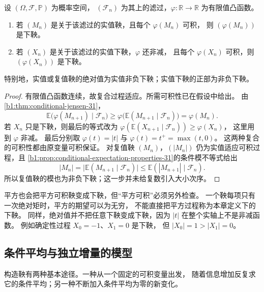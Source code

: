 \begin{proposition}[凸函数作用下的鞅]
\label{b1:prop:martingale-convex-31}
设 \((\Omega,\mathcal F,\mathbb P)\) 为概率空间，
\((\mathcal F_n)\) 为其上的滤过，\(\varphi:\mathbb R\to\mathbb R\) 为有限值凸函数。
\begin{enumerate}
 \item\label{b1:item:martingale-convex-31}
 若 \((M_n)\) 是关于该滤过的实值鞅，且每个 \(\varphi(M_n)\) 可积，
 则 \((\varphi(M_n))\) 是下鞅。
 \item\label{b1:item:submartingale-convex-31}
 若 \((X_n)\) 是关于该滤过的实值下鞅，\(\varphi\) 还非减，
 且每个 \(\varphi(X_n)\) 可积，则 \((\varphi(X_n))\) 是下鞅。
\end{enumerate}
特别地，实值或复值鞅的绝对值为实值非负下鞅；实值下鞅的正部为非负下鞅。
\end{proposition}
\begin{proof}
有限值凸函数连续，故复合过程适应。所需可积性已在假设中给出。
由\cref{b1:thm:conditional-jensen-31}，
\[
 \mathbb E\bigl(\varphi(M_{n+1})\mid\mathcal F_n\bigr)
 \geq\varphi\bigl(\mathbb E(M_{n+1}\mid\mathcal F_n)\bigr)
 =\varphi(M_n).
\]
若 \(X_n\) 只是下鞅，则最后的等式改为
\(\varphi(\mathbb E(X_{n+1}\mid\mathcal F_n))\geq\varphi(X_n)\)，
这里用到 \(\varphi\) 非减。
最后分别取 \(\varphi(t)=|t|\) 与 \(\varphi(t)=t^+=\max(t,0)\)。
这两种复合的可积性都由原变量可积保证。
对复值鞅 \((M_n)\)，\((|M_n|)\) 仍为实值适应可积过程，且%
\cref{b1:prop:conditional-expectation-properties-31}的条件模不等式给出
\[
 |M_n|=\bigl|\mathbb E(M_{n+1}\mid\mathcal F_n)\bigr|
 \leq\mathbb E(|M_{n+1}|\mid\mathcal F_n).
\]
所以复值鞅的模也为非负下鞅；这一步并未给复数引入大小次序。
\end{proof}

平方也会把平方可积鞅变成下鞅，但“平方可积”必须另外检查。
一个鞅每项只有一次绝对矩时，平方的期望可以为无穷，
不能直接把平方过程称为本章定义下的下鞅。
同样，绝对值并不把任意下鞅变成下鞅，因为 \(|t|\) 在整个实轴上不是非减函数。
例如确定性过程 \(X_0=-1\)、\(X_1=0\) 是下鞅，
但 \(|X_0|=1>|X_1|=0\)。

\subsection{条件平均与独立增量的模型}
\label{b1:subsec:310303}

构造鞅有两种基本途径。一种从一个固定的可积变量出发，
随着信息增加反复求它的条件平均；另一种不断加入条件平均为零的新变化。

